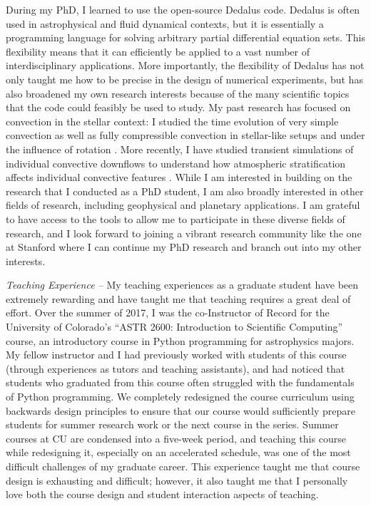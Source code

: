 \documentclass[onecolumn, 11pt, hmargin=1in, vmargin=1in]{aastex62}
\begin{document}
During my PhD, I learned to use the open-source Dedalus \citep{burns&all2019} code.
Dedalus is often used in astrophysical and fluid dynamical contexts, but it is essentially a programming language for solving arbitrary partial differential equation sets.
This flexibility means that it can efficiently be applied to a vast number of interdisciplinary applications.
More importantly, the flexibility of Dedalus has not only taught me how to be precise in the design of numerical experiments, but has also broadened my own research interests because of the many scientific topics that the code could feasibly be used to study.
My past research has focused on convection in the stellar context: I studied the time evolution of very simple convection \citep{anders&all2018} as well as fully compressible convection in stellar-like setups \citep{anders&brown2017} and under the influence of rotation \citep{anders&all2019}.
More recently, I have studied transient simulations of individual convective downflows to understand how atmospheric stratification affects individual convective features \citep{andersLB2019}.
While I am interested in building on the research that I conducted as a PhD student, I am also broadly interested in other fields of research, including geophysical and planetary applications.
I am grateful to have access to the tools to allow me to participate in these diverse fields of research, and I look forward to joining a vibrant research community like the one at Stanford where I can continue my PhD research and branch out into my other interests.

\emph{Teaching Experience --}
My teaching experiences as a graduate student have been extremely rewarding and have taught me that teaching requires a great deal of effort.
Over the summer of 2017, I was the co-Instructor of Record for the University of Colorado's ``ASTR 2600: Introduction to Scientific Computing'' course, an introductory course in Python programming for astrophysics majors.
My fellow instructor and I had previously worked with students of this course (through experiences as tutors and teaching assistants), and had noticed that students who graduated from this course often struggled with the fundamentals of Python programming.
We completely redesigned the course curriculum using backwards design principles to ensure that our course would sufficiently prepare students for summer research work or the next course in the series.
Summer courses at CU are condensed into a five-week period, and teaching this course while redesigning it, especially on an accelerated schedule, was one of the most difficult challenges of my graduate career.
This experience taught me that course design is exhausting and difficult; however, it also taught me that I personally love both the course design and student interaction aspects of teaching.
\end{document}
